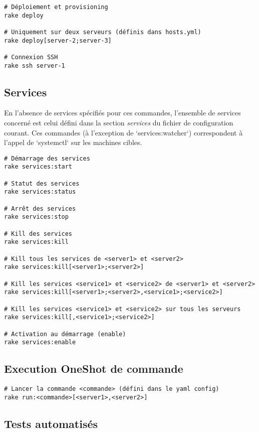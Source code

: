 \documentclass[a4paper,oneside,12pt]{article}
\begin{document}
\begin{verbatim}
# Déploiement et provisioning
rake deploy

# Uniquement sur deux serveurs (définis dans hosts.yml)
rake deploy[server-2;server-3]

# Connexion SSH
rake ssh server-1
\end{verbatim}

\subsection{Services}

En l'absence de services spécifiés pour ces commandes, l'ensemble de services
concerné est celui défini dans la section \textit{services} du fichier de configuration
courant. Ces commandes (à l'exception de `services:watcher`) correspondent
à l'appel de `systemctl` sur les machines cibles.

\begin{verbatim}
# Démarrage des services
rake services:start

# Statut des services
rake services:status

# Arrêt des services
rake services:stop

# Kill des services
rake services:kill

# Kill tous les services de <server1> et <server2>
rake services:kill[<server1>;<server2>]

# Kill les services <service1> et <service2> de <server1> et <server2>
rake services:kill[<server1>;<server2>,<service1>;<service2>]

# Kill les services <service1> et <service2> sur tous les serveurs
rake services:kill[,<service1>;<service2>]

# Activation au démarrage (enable)
rake services:enable
\end{verbatim}

\subsection{Execution OneShot de commande}

\begin{verbatim}
# Lancer la commande <commande> (défini dans le yaml config)
rake run:<commande>[<server1>,<server2>]
\end{verbatim}


\subsection{Tests automatisés}
\end{document}
